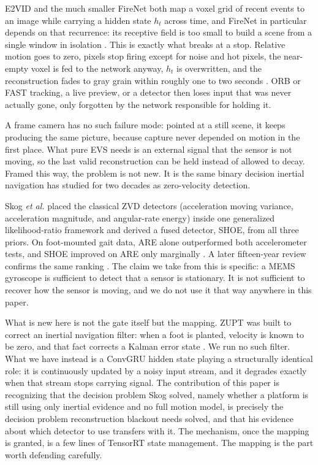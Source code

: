 \documentclass[journal]{IEEEtran}
\begin{document}
E2VID \cite{rebecq2021} and the much smaller FireNet \cite{scheerlinck2020} both
map a voxel grid of recent events to an image while carrying a hidden state
\(h_t\) across time, and FireNet in particular depends on that recurrence: its
receptive field is too small to build a scene from a single window in isolation
\cite{scheerlinck2020}. This is exactly what breaks at a stop. Relative motion
goes to zero, pixels stop firing except for noise and hot pixels, the near-empty
voxel is fed to the network anyway, \(h_t\) is overwritten, and the
reconstruction fades to gray grain within roughly one to two seconds
\cite{scheerlinck2020}. ORB or FAST tracking, a live preview, or a detector then
loses input that was never actually gone, only forgotten by the network
responsible for holding it.

A frame camera has no such failure mode: pointed at a still scene, it keeps
producing the same picture, because capture never depended on motion in the
first place. What pure EVS needs is an external signal that the sensor is not
moving, so the last valid reconstruction can be held instead of allowed to
decay. Framed this way, the problem is not new. It is the same binary decision
inertial navigation has studied for two decades as zero-velocity detection.

Skog \textit{et al.} \cite{skog2010tbe} placed the classical ZVD detectors
(acceleration moving variance, acceleration magnitude, and angular-rate energy)
inside one generalized likelihood-ratio framework and derived a fused detector,
SHOE, from all three priors. On foot-mounted gait data, ARE alone outperformed
both accelerometer tests, and SHOE improved on ARE only marginally
\cite{skog2010tbe,skog2010ipin}. A later fifteen-year review confirms the same
ranking \cite{wahlstrom2021}. The claim we take from this is specific: a MEMS
gyroscope is sufficient to detect that a sensor is stationary. It is not
sufficient to recover how the sensor is moving, and we do not use it that way
anywhere in this paper.

What is new here is not the gate itself but the mapping. ZUPT was built to
correct an inertial navigation filter: when a foot is planted, velocity is known
to be zero, and that fact corrects a Kalman error state \cite{foxlin2005}. We
run no such filter. What we have instead is a ConvGRU hidden state playing a
structurally identical role: it is continuously updated by a noisy input stream,
and it degrades exactly when that stream stops carrying signal. The contribution
of this paper is recognizing that the decision problem Skog solved, namely
whether a platform is still using only inertial evidence and no full motion
model, is precisely the decision problem reconstruction blackout needs solved,
and that his evidence about which detector to use transfers with it. The
mechanism, once the mapping is granted, is a few lines of TensorRT state
management. The mapping is the part worth defending carefully.
\end{document}
